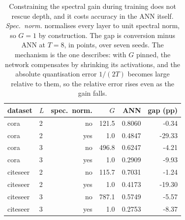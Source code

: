 \begin{table}[t]
\centering
\footnotesize
\caption{Constraining the spectral gain during training does not rescue depth, and it costs accuracy in the ANN itself. \emph{Spec.\ norm.} normalises every layer to unit spectral norm, so $G=1$ by construction. The gap is conversion minus ANN at $T=8$, in points, over seven seeds. The mechanism is the one  describes: with $G$ pinned, the network compensates by shrinking its activations, and the absolute quantisation error $1/(2T)$ becomes large relative to them, so the relative error rises even as the gain falls.}\label{tab:specnorm}
\begin{tabular}{llrrrr}
\toprule
dataset & $L$ & spec.\ norm. & $G$ & ANN & gap (pp) \\
\midrule
cora & 2 & no & 121.5 & 0.8060 & -0.34 \\
cora & 2 & yes & 1.0 & 0.4847 & -29.33 \\
cora & 3 & no & 496.8 & 0.6247 & -4.21 \\
cora & 3 & yes & 1.0 & 0.2909 & -9.93 \\
citeseer & 2 & no & 115.7 & 0.7031 & -1.24 \\
citeseer & 2 & yes & 1.0 & 0.4173 & -19.30 \\
citeseer & 3 & no & 787.1 & 0.5749 & -5.57 \\
citeseer & 3 & yes & 1.0 & 0.2753 & -8.37 \\
\bottomrule
\end{tabular}
\end{table}
